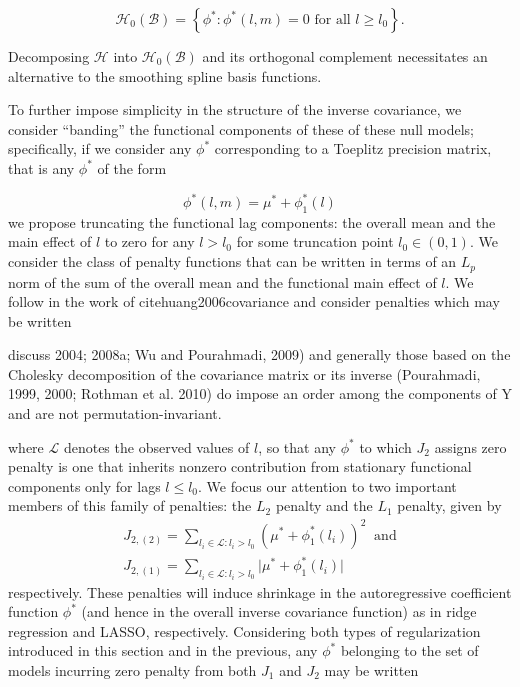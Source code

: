 \documentclass[12pt]{article}
\theoremstyle{definition}
\begin{document}
\begin{equation} \label{eq:banded-penalty-nullspace}
\mathcal{H}_0\left(\mathcal{B}\right) = \left\{ \phi^*: \phi^*\left(l,m\right) = 0 \mbox{ for all } l \ge l_0 \right\}.
\end{equation}

Decomposing $\mathcal{H}$ into $\mathcal{H}_0\left(\mathcal{B}\right)$ and its orthogonal complement necessitates an alternative to the smoothing spline basis functions. 




To further impose simplicity in the structure of the inverse covariance, we consider ``banding'' the functional components of these of these null models; specifically, if we consider any $\phi^*$ corresponding to a Toeplitz precision matrix, that is any $\phi^*$ of the form

\begin{equation}
\phi^*\left(l,m\right) = \mu^* + \phi^*_1\left(l\right)
\end{equation}
\noindent
we propose truncating the functional lag components:  the overall mean and the main effect of $l$ to zero for any $l > l_0$ for some truncation point $l_0 \in \left(0,1\right)$. We consider the class of penalty functions that can be written in terms of an $L_p$ norm of the sum of the overall mean and the functional main effect of $l$. We follow in the work of cite{huang2006covariance} and consider penalties which may be written



\citet{bickel2008regularized} discuss 
2004; 2008a; Wu and Pourahmadi, 2009) and generally those based on the Cholesky decomposition
of the covariance matrix or its inverse (Pourahmadi, 1999, 2000; Rothman et al.
2010) do impose an order among the components of Y and are not permutation-invariant.



where $\mathcal{L}$ denotes the observed values of $l$, so that any $\phi^*$ to which $J_2$ assigns zero penalty is one that inherits nonzero contribution from stationary functional components only for lags $l \le l_0$. We focus our attention to two important members of this family of penalties: the $L_2$ penalty and the $L_1$ penalty, given by
\begin{eqnarray} \nonumber
 J_{2,\left(2\right)} = \sum_{ l_i \in \mathcal{L}: l_i > l_0} \left( \mu^* + \phi^*_1\left(l_i\right) \right)^2 \label{L2penalty} \;\;\mbox{and}\\
 J_{2,\left(1\right)} = \sum_{ l_i \in \mathcal{L}: l_i > l_0} \vert \mu^* + \phi^*_1\left(l_i\right) \vert \label{L1penalty}
 \end{eqnarray}\noindent
respectively. These penalties will induce shrinkage in the autoregressive coefficient function $\phi^*$ (and hence in the overall inverse covariance function) as in ridge regression and LASSO, respectively. Considering both types of regularization introduced in this section and in the previous, any $\phi^*$ belonging to the set of models incurring zero penalty from both $J_1$ and $J_2$ may be written
\end{document}
